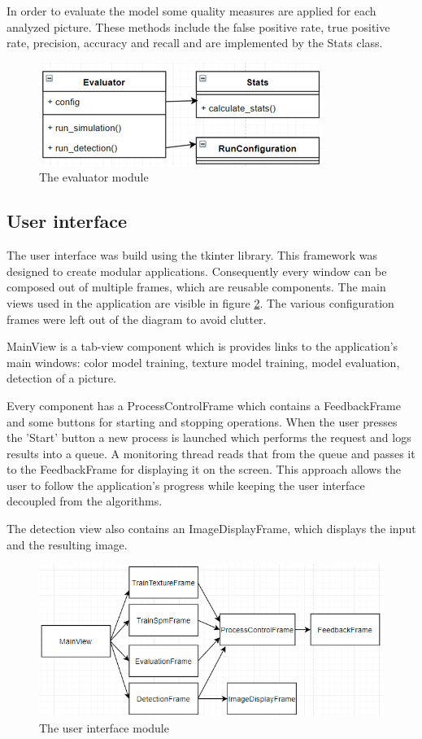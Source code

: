 \documentclass[12pt]{report}
\begin{document}
	In order to evaluate the model some quality measures are applied for each analyzed picture. These methods include the false positive rate, true positive rate, precision, accuracy and recall and are implemented by the Stats class.
	
	\begin{figure}[h!]
		\centering
		\includegraphics[]{design/evaluator.png}
		\caption{The evaluator module}
		\label{fig:evaluator}
	\end{figure}
	
	\subsection{User interface}
	
	The user interface was build using the tkinter library. This framework was designed to create modular applications. Consequently every window can be composed out of multiple frames, which are reusable components. The main views used in the application are visible in figure \ref{fig:gui}. The various configuration frames were left out of the diagram to avoid clutter.
	
	MainView is a tab-view component which is provides links to the application's main windows: color model training, texture model training, model evaluation, detection of a picture.
	
	Every component has a ProcessControlFrame which contains a FeedbackFrame and some buttons for starting and stopping operations. When the user presses the 'Start' button a new process is launched which performs the request and logs results into a queue. A monitoring thread reads that from the queue and passes it to the FeedbackFrame for displaying it on the screen. This approach allows the user to follow the application's progress while keeping the user interface decoupled from the algorithms.
	
	The detection view also contains an ImageDisplayFrame, which displays the input and the resulting image.
	
	\begin{figure}[h!]
		\centering
		\includegraphics[]{design/gui.png}
		\caption{The user interface module}
		\label{fig:gui}
	\end{figure}
\end{document}

